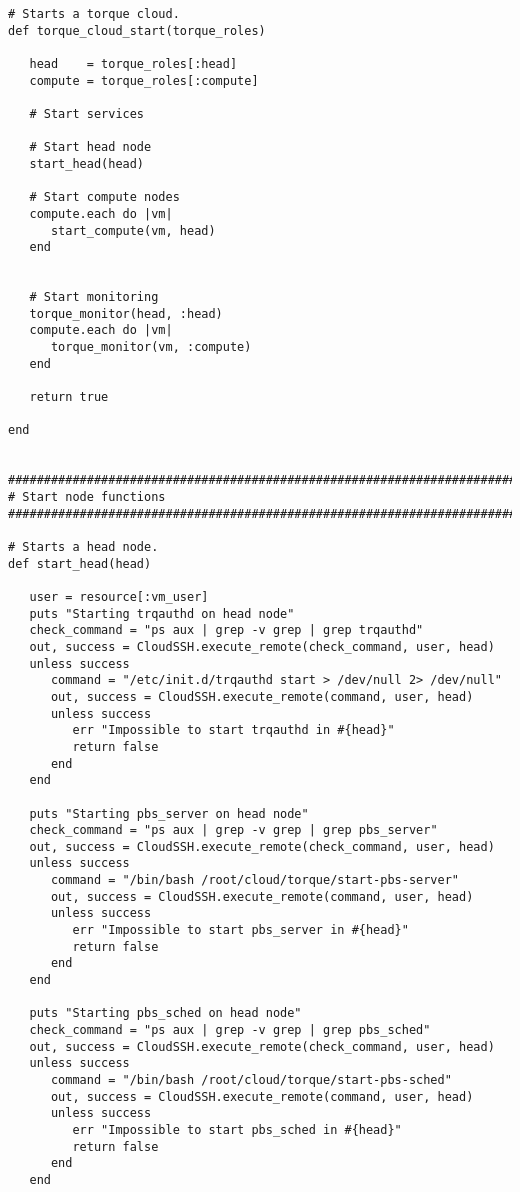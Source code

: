 \begin{lstlisting}
# Starts a torque cloud.
def torque_cloud_start(torque_roles)

   head    = torque_roles[:head]
   compute = torque_roles[:compute]

   # Start services
   
   # Start head node
   start_head(head)
   
   # Start compute nodes
   compute.each do |vm|
      start_compute(vm, head)
   end
   
   
   # Start monitoring
   torque_monitor(head, :head)
   compute.each do |vm|
      torque_monitor(vm, :compute)
   end
   
   return true
   
end


################################################################################
# Start node functions
################################################################################

# Starts a head node.
def start_head(head)
   
   user = resource[:vm_user]
   puts "Starting trqauthd on head node"
   check_command = "ps aux | grep -v grep | grep trqauthd"
   out, success = CloudSSH.execute_remote(check_command, user, head)
   unless success
      command = "/etc/init.d/trqauthd start > /dev/null 2> /dev/null"
      out, success = CloudSSH.execute_remote(command, user, head)
      unless success
         err "Impossible to start trqauthd in #{head}"
         return false
      end
   end
   
   puts "Starting pbs_server on head node"
   check_command = "ps aux | grep -v grep | grep pbs_server"
   out, success = CloudSSH.execute_remote(check_command, user, head)
   unless success
      command = "/bin/bash /root/cloud/torque/start-pbs-server"
      out, success = CloudSSH.execute_remote(command, user, head)
      unless success
         err "Impossible to start pbs_server in #{head}"
         return false
      end
   end
   
   puts "Starting pbs_sched on head node"
   check_command = "ps aux | grep -v grep | grep pbs_sched"
   out, success = CloudSSH.execute_remote(check_command, user, head)
   unless success
      command = "/bin/bash /root/cloud/torque/start-pbs-sched"
      out, success = CloudSSH.execute_remote(command, user, head)
      unless success
         err "Impossible to start pbs_sched in #{head}"
         return false
      end
   end


\end{lstlisting}
